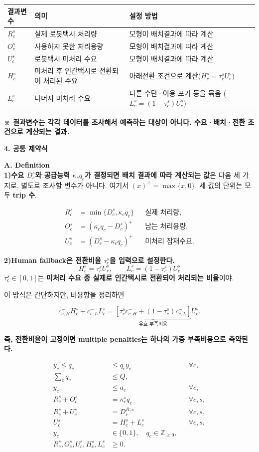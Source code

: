 \documentclass[11pt,a4paper]{article}
\newcommand{\blocktitle}[1]{\par\bigskip\noindent\textbf{\large #1}\par\smallskip}
\begin{document}
\begin{longtable}{@{}P{0.16\textwidth}P{0.42\textwidth}P{0.34\textwidth}@{}}
\toprule
결과변수 & 의미 & 설정 방법 \\
\midrule
\endhead
$R_c^s$ & 실제 로봇택시 처리량 & 모형이 배치결과에 따라 계산 \\
$O_c^s$ & 사용하지 못한 처리용량 & 모형이 배치결과에 따라 계산 \\
$U_c^s$ & 로봇택시 미처리 수요 & 모형이 배치결과에 따라 계산 \\
$H_c^s$ & 미처리 후 인간택시로 전환되어 처리된 수요 & 아래전환 조건으로 계산($H_c^s=\tau_c^sU_c^s$) \\
$L_c^s$ & 나머지 미처리 수요 & 다른 수단·이용 포기 등을 묶음 ($L_c^s=(1-\tau_c^s)U_c^s$) \\
\bottomrule
\end{longtable}

\textbf{※ 결과변수는 각각 데이터를 조사해서 예측하는 대상이 아니다. 수요·배치·전환 조건으로 계산되는 결과.}

\blocktitle{4. 공통 제약식}

\textbf{A. Definition} \\
\textbf{1)수요 $D_c^s$와 공급능력 $\kappa_cq_c$가 결정되면 배치 결과에 따라 계산되는 값}은 다음 세 가지로, 별도로 조사할 변수가 아니다. 여기서 $(x)^+=\max\{x,0\}$. 세 값의 단위는 모두 \textbf{trip 수}.

\[
\begin{aligned}
R_c^s&=\min\{D_c^s,\kappa_cq_c\}
&&\text{실제 처리량},\\
O_c^s&=(\kappa_cq_c-D_c^s)^+
&&\text{남는 처리용량},\\
U_c^s&=(D_c^s-\kappa_cq_c)^+
&&\text{미처리 잠재수요}.
\end{aligned}
\]

\textbf{2)Human fallback은 전환비율 $\tau_c^s$을 입력으로 설정한다.}
\[
H_c^s=\tau_c^sU_c^s,\qquad
L_c^s=(1-\tau_c^s)U_c^s
\]
$\tau_c^s\in[0,1]$는 \textbf{미처리 수요 중 실제로 인간택시로 전환되어 처리되는 비율}이야.

이 방식은 간단하지만, 비용항을 정리하면

\[
c_{c,H}^-H_c^s+c_{c,L}^-L_c^s
=
\underbrace{
\left[\tau_c^sc_{c,H}^-+(1-\tau_c^s)c_{c,L}^-\right]
}_{\text{유효 부족비용}}
U_c^s.
\]

\textbf{즉, 전환비율이 고정이면 multiple penalties는 하나의 가중 부족비용으로 축약된다.}

\[\boxed{
\begin{aligned}
y_c\le q_c&\le\bar q_cy_c
&&\forall c,\\
\sum_cq_c&\le Q,\\
y_c&\le a_c
&&\forall c,\\[2pt]
R_c^s+O_c^s&=\kappa_c^sq_c
&&\forall c,s,\\
R_c^s+U_c^s&=D_c^{R,s}
&&\forall c,s,\\
U_c^s&=H_c^s+L_c^s
&&\forall c,s,\\
y_c&\in\{0,1\},\quad q_c\in\mathbb Z_{\ge0},\\
R_c^s,O_c^s,U_c^s,H_c^s,L_c^s&\ge0.
\end{aligned}
}\]
\end{document}
